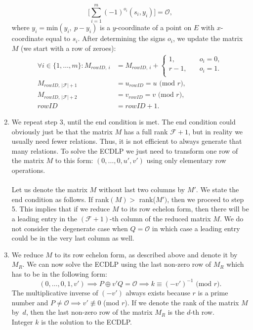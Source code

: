 \documentclass[thesis=M,english]{FITthesis}[2012/10/20]
\theoremstyle{remark}
\theoremstyle{definition}
\begin{document}
\begin{enumerate}
$$
\bigg[\sum_{i=1}^m(-1)^{o_i}(s_i, y_i) \bigg] = \mathcal{O}, 
$$
where $y_i = \text{min}(y_i,\ p - y_i)$ is a $y$-coordinate of a point on $E$ with $x$-coordinate equal to $s_i$. After determining the signs $o_i$, we update the matrix $M$ (we start with a row of zeroes):
\begin{align*}
\forall i \in \{1,\ldots,m\}: M_{rowID,\ i} &= M_{rowID,\ i} + \begin{cases} 1, \quad &o_i = 0, \\
r-1, \quad &o_i = 1. \\
\end{cases}\\
M_{rowID,\ |\mathcal{F}| + 1} &= u_{rowID} = u \text{ (mod $r$)}, \\
M_{rowID,\ |\mathcal{F}| + 2} &= v_{rowID} = v \text{ (mod $r$)}, \\
rowID &= rowID + 1.
\end{align*}
\item We repeat step 3, until the end condition is met. The end condition could obviously just be that the matrix $M$ has a full rank $\mathcal{F} + 1$, but in reality we usually need fewer relations. Thus, it is not efficient to always generate that many relations. To solve the ECDLP we just need to transform one row of the matrix $M$ to this form: $(0, \ldots, 0,u',v')$ using only elementary row operations. \\ \\
\noindent Let us denote the matrix $M$ without last two columns by $M'$. We state the end condition as follows. If rank$(M) > $ rank($M')$, then we proceed to step 5. This implies that if we reduce $M$ to its row echelon form, then there will be a leading entry in the $(\mathcal{F} + 1)$-th column of the reduced matrix $M$. We do not consider the degenerate case when $Q = \mathcal{O}$ in which case a leading entry could be in the very last column as well.
\item We reduce $M$ to its row echelon form, as described above and denote it by $M_R$. We can now solve the ECDLP using the last non-zero row of $M_R$ which has to be in the following form:
$$
(0, \ldots, 0, 1, v') \implies P \oplus v'Q = \mathcal{O} \implies k \equiv (-v')^{-1} \text{ (mod $r$)}.
$$
The multiplicative inverse of $(-v')$ always exists because $r$ is a prime number and $P \neq \mathcal{O} \implies v' \not\equiv 0$ (mod $r$). If we denote the rank of the matrix $M$ by~$d$, then the last non-zero row of the matrix $M_R$ is the $d$-th row. \\ Integer $k$ is the solution to the ECDLP.
\end{enumerate}
\end{document}

